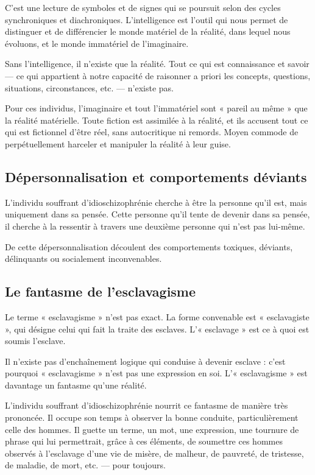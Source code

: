 \documentclass[12pt,oneside]{article}
\begin{document}
C'est une lecture de symboles et de signes qui se poursuit selon des cycles synchroniques et diachroniques. L'intelligence est l'outil qui nous permet de distinguer et de différencier le monde matériel de la réalité, dans lequel nous évoluons, et le monde immatériel de l'imaginaire.

Sans l'intelligence, il n'existe que la réalité. Tout ce qui est connaissance et savoir --- ce qui appartient à notre capacité de raisonner a priori les concepts, questions, situations, circonstances, etc. --- n'existe pas.

Pour ces individus, l'imaginaire et tout l'immatériel sont « pareil au même » que la réalité matérielle. Toute fiction est assimilée à la réalité, et ils accusent tout ce qui est fictionnel d'être réel, sans autocritique ni remords. Moyen commode de perpétuellement harceler et manipuler la réalité à leur guise.

\subsection{Dépersonnalisation et comportements déviants}

L'individu souffrant d'idioschizophrénie cherche à être la personne qu'il est, mais uniquement dans sa pensée. Cette personne qu'il tente de devenir dans sa pensée, il cherche à la ressentir à travers une deuxième personne qui n'est pas lui-même.

De cette dépersonnalisation découlent des comportements toxiques, déviants, délinquants ou socialement inconvenables.

\subsection{Le fantasme de l'esclavagisme}

Le terme « esclavagisme » n'est pas exact. La forme convenable est « esclavagiste », qui désigne celui qui fait la traite des esclaves. L'« esclavage » est ce à quoi est soumis l'esclave.

Il n'existe pas d'enchaînement logique qui conduise à devenir esclave : c'est pourquoi « esclavagisme » n'est pas une expression en soi. L'« esclavagisme » est davantage un fantasme qu'une réalité.

L'individu souffrant d'idioschizophrénie nourrit ce fantasme de manière très prononcée. Il occupe son temps à observer la bonne conduite, particulièrement celle des hommes. Il guette un terme, un mot, une expression, une tournure de phrase qui lui permettrait, grâce à ces éléments, de soumettre ces hommes observés à l'esclavage d'une vie de misère, de malheur, de pauvreté, de tristesse, de maladie, de mort, etc. --- pour toujours.
\end{document}
